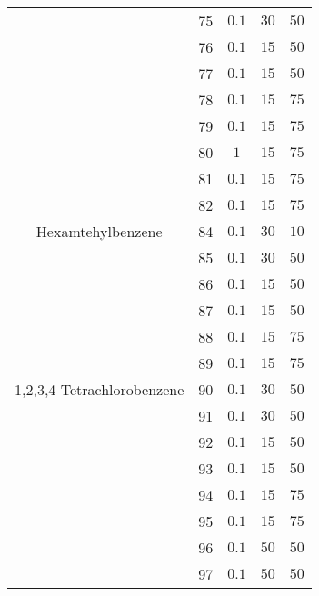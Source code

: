 \documentclass  [
  paper    = a4,
  BCOR     = 10mm,
  twoside,
  fontsize = 12pt,
  fleqn,
  toc      = bibnumbered,
  toc      = listofnumbered,
  numbers  = noendperiod,
  headings = normal,
  listof   = leveldown,
  version  = 3.03
]                                       {scrreprt}
\begin{document}
\begin{table*}[!h]
\begin{tabular}{c|c|ccc}
		& 75 & $0.1$ & $30$ & $50$\\
		& 76 & $0.1$ & $15$ & $50$\\
		& 77 & $0.1$ & $15$ & $50$\\
		& 78 & $0.1$ & $15$ & $75$\\
		& 79 & $0.1$ & $15$ & $75$\\
		& 80 & $1$ & $15$ & $75$\\
		& 81 & $0.1$ & $15$ & $75$\\
		& 82 & $0.1$ & $15$ & $75$\\
		\midrule
		\midrule
		Hexamtehylbenzene & 84 & $0.1$ & $30$ & $10$\\
		& 85 & $0.1$ & $30$ & $50$\\
		& 86 & $0.1$ & $15$ & $50$\\
		& 87 & $0.1$ & $15$ & $50$\\
		& 88 & $0.1$ & $15$ & $75$\\
		& 89 & $0.1$ & $15$ & $75$\\
		\midrule
		\midrule
		1,2,3,4-Tetrachlorobenzene & 90 & $0.1$ & $30$ & $50$\\
		& 91 & $0.1$ & $30$ & $50$\\
		& 92 & $0.1$ & $15$ & $50$\\
		& 93 & $0.1$ & $15$ & $50$\\
		& 94 & $0.1$ & $15$ & $75$\\
		& 95 & $0.1$ & $15$ & $75$\\
		& 96 & $0.1$ & $50$ & $50$\\
		& 97 & $0.1$ & $50$ & $50$\\
		\hline
	\end{tabular}
\end{table*}
\end{document}
